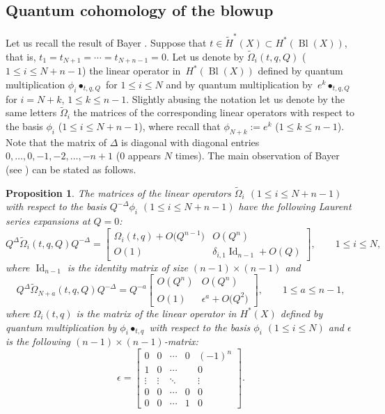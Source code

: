 \documentclass[10pt,a4paper]{article}
\numberwithin{equation}{section}
\newtheorem{Proposition}[Theorem]{Proposition}
\begin{document}
\subsection{Quantum cohomology of the blowup}
Let us recall the result of Bayer \cite{Ba}. Suppose that $t\in
\widetilde{H}^*(X)\subset H^*(\operatorname{Bl}(X))$, that is,
$t_1=t_{N+1}=\cdots=t_{N+n-1}=0$. Let us denote by
$\widetilde{\Omega}_i(t,q,Q)$ ($1\leq i\leq N+n-1$) the linear operator in~$H^*(\operatorname{Bl}(X))$ defined by quantum multiplication
$\phi_i\bullet_{t,q,Q}$ for $1\leq i\leq N$ and by quantum
multiplication by~$e^k\bullet_{t,q,Q}$ for $i=N+k$, $1\leq k\leq n-1$.
Slightly
abusing the notation let us denote by the same letters
$\widetilde{\Omega}_i$ the matrices of the corresponding linear
operators with respect to the basis $\phi_i$ ($1\leq
i\leq N+n-1$), where recall that $\phi_{N+k}:=e^k$ ($1\leq k\leq n-1$). Note that the matrix of
$\Delta$ is diagonal with diagonal entries $0,\dots, 0, -1, -2,\dots,
-n+1 $ ($0$ appears $N$ times). The main observation of Bayer (see \cite[Section 3.4]{Ba}) can be stated as follows.
\begin{Proposition}\label{prop:Ba}
The matrices of the linear operators $\widetilde{\Omega}_i$ $(1\leq
i\leq N+n-1)$ with respect to the basis $Q^{-\Delta} \phi_i$ $(1\leq
i\leq N+n-1)$ have the
following Laurent series expansions at $Q=0$:
\begin{equation}\label{qm:phii}
Q^{\Delta} \widetilde{\Omega}_i(t,q,Q) Q^{-\Delta} =
\begin{bmatrix}
\Omega_i(t,q) +O\big(Q^{n-1}\big) & O(Q^n) \\
O(1) & \delta_{i,1} \operatorname{Id}_{n-1} + O(Q)
\end{bmatrix}
,\qquad 1\leq i\leq N,
\end{equation}
where $\operatorname{Id}_{n-1}$ is the identity matrix of size
$(n-1)\times (n-1)$ and
\begin{equation}\label{qm:e^k}
Q^\Delta \widetilde{\Omega}_{N+a}(t,q,Q) Q^{-\Delta} =
Q^{-a}
\begin{bmatrix}
O(Q^n)& O(Q^n) \\
O(1) & \epsilon^a + O\big(Q^2\big)
\end{bmatrix}
,\qquad 1\leq a\leq n-1,
\end{equation}
where $\Omega_i(t,q)$ is the matrix of the linear operator in $H^*(X)$
defined by quantum multiplication by $\phi_i\bullet_{t,q}$ with
respect to the basis $\phi_i$ $(1\leq i\leq N)$ and $\epsilon$ is the
following $(n-1)\times (n-1)$-matrix:
\[
\epsilon =
\begin{bmatrix}
0 & 0 & \cdots & 0 & (-1)^n \\
1 & 0 & \cdots & & 0 \\
 \vdots & \vdots & \ddots & & \vdots \\
0 & 0 & \cdots & 0 & 0 \\
0 & 0 & \cdots & 1 & 0
\end{bmatrix}.
\]
\end{Proposition}
\end{document}
